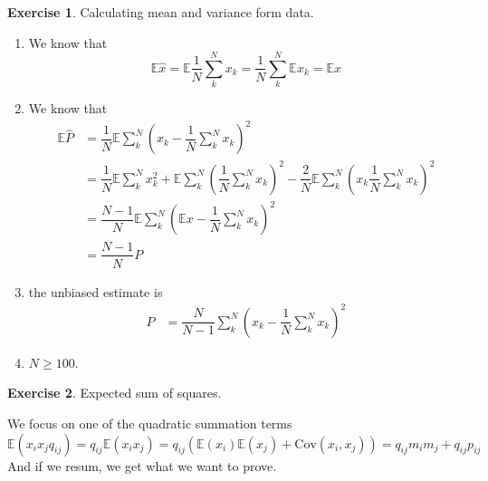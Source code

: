 \documentclass[11pt,a4paper]{report}
\theoremstyle{definition}\newtheorem{exercise}{Exercise}[chapter]
\begin{document}
\begin{exercise}Calculating mean and variance form data.\\
\end{exercise}
\begin{answer}
\begin{enumerate}[label=(\alph*)]
    \item We know that 
    \begin{equation}
        \mathbb{E}\hat x=\mathbb{E}\dfrac{1}{N} \sum^N_k x_k=\dfrac{1}{N} \sum^N_k \mathbb{E}x_k=\mathbb{E}x
    \end{equation}
    \item We know that 
    \begin{align}
        \mathbb{E}\hat P
        &=\dfrac{1}{N}\mathbb{E}\sum^N_k\left(x_k-\dfrac{1}{N} \sum^N_k x_k\right)^2\\
        &=\dfrac{1}{N}\mathbb{E}\sum^N_k x_k^2
        +\mathbb{E}\sum^N_k\left(\dfrac{1}{N} \sum^N_k x_k\right)^2
        -\dfrac{2}{N}\mathbb{E}\sum^N_k\left(x_k\dfrac{1}{N} \sum^N_k x_k\right)^2\\
        &=\dfrac{N-1}{N}\mathbb{E}\sum^N_k\left(\mathbb{E}x-\dfrac{1}{N} \sum^N_k x_k\right)^2\\
        &=\dfrac{N-1}{N}P
    \end{align}
    \item the unbiased estimate is
    \begin{align}
        \hat P
        &=\dfrac{N}{N-1}\sum^N_k\left(x_k-\dfrac{1}{N} \sum^N_k x_k\right)^2
    \end{align}
    \item $N\ge 100$.
\end{enumerate}
\end{answer}


\begin{exercise}Expected sum of squares.\\
\end{exercise}
\begin{answer}
We focus on one of the quadratic summation terms
\begin{equation}
    \mathbb{E}(x_i x_j q_{ij})
    =q_{ij}\mathbb{E}(x_i x_j)
    =q_{ij}\left(\mathbb{E}(x_i)\mathbb{E}(x_j)+\text{Cov}(x_i,x_j)\right)
    =q_{ij} m_i m_j+q_{ij} p_{ij}
\end{equation}
And if we resum, we get what we want to prove.
\end{answer}
\end{document}
